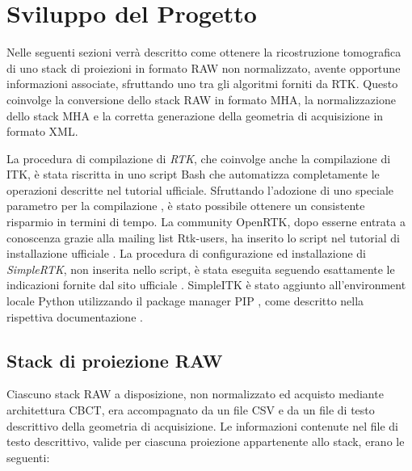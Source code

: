 \documentclass[a4paper,12pt, doubleside]{report}
\begin{document}
                                              
    \chapter{Sviluppo del Progetto}
        \par
            Nelle seguenti sezioni verrà descritto come ottenere la ricostruzione tomografica di uno stack di proiezioni in formato RAW non normalizzato, avente opportune informazioni associate, sfruttando uno tra gli algoritmi forniti da RTK. Questo coinvolge la conversione dello stack RAW in formato MHA, la normalizzazione dello stack MHA e la corretta generazione della geometria di acquisizione in formato XML. 
            
        \bigskip
        \par
            La procedura di compilazione di \textit{RTK}, che coinvolge anche la compilazione di ITK, è stata riscritta in uno script Bash \cite{script-bash} che automatizza completamente le operazioni descritte nel tutorial ufficiale. Sfruttando l'adozione di uno speciale parametro per la compilazione \cite{parallel-j}, è stato possibile ottenere un consistente risparmio in termini di tempo. La community OpenRTK, dopo esserne entrata a conoscenza grazie alla mailing list Rtk-users, ha inserito lo script nel tutorial di installazione ufficiale \cite{wiki-rtk}. La procedura di configurazione ed installazione di \textit{SimpleRTK}, non inserita nello script, è stata eseguita seguendo esattamente le indicazioni fornite dal sito ufficiale \cite{simplertk-install}. SimpleITK è stato aggiunto all'environment locale Python utilizzando il package manager PIP \cite{python-pip}, come descritto nella rispettiva documentazione \cite{simpleitk-install}.

        \section{Stack di proiezione RAW}
        \label{sec:stack-di-proiezione-raw}
            \par
                Ciascuno stack RAW a disposizione, non normalizzato ed acquisto mediante architettura CBCT, era accompagnato da un file CSV e da un file di testo descrittivo della geometria di acquisizione. Le informazioni contenute nel file di testo descrittivo, valide per ciascuna proiezione appartenente allo stack, erano le seguenti:
                    
\end{document}
